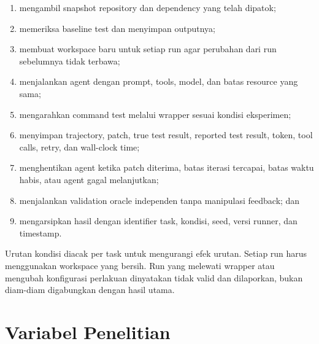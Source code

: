 \begin{enumerate}[leftmargin=*]
    \item mengambil snapshot repository dan dependency yang telah dipatok;
    \item memeriksa baseline test dan menyimpan outputnya;
    \item membuat workspace baru untuk setiap run agar perubahan dari run sebelumnya tidak terbawa;
    \item menjalankan agent dengan prompt, tools, model, dan batas resource yang sama;
    \item mengarahkan command test melalui wrapper sesuai kondisi eksperimen;
    \item menyimpan trajectory, patch, true test result, reported test result, token, tool calls, retry, dan wall-clock time;
    \item menghentikan agent ketika patch diterima, batas iterasi tercapai, batas waktu habis, atau agent gagal melanjutkan;
    \item menjalankan validation oracle independen tanpa manipulasi feedback; dan
    \item mengarsipkan hasil dengan identifier task, kondisi, seed, versi runner, dan timestamp.
\end{enumerate}

Urutan kondisi diacak per task untuk mengurangi efek urutan. Setiap run harus menggunakan workspace yang bersih. Run yang melewati wrapper atau mengubah konfigurasi perlakuan dinyatakan tidak valid dan dilaporkan, bukan diam-diam digabungkan dengan hasil utama.

\section{Variabel Penelitian}

